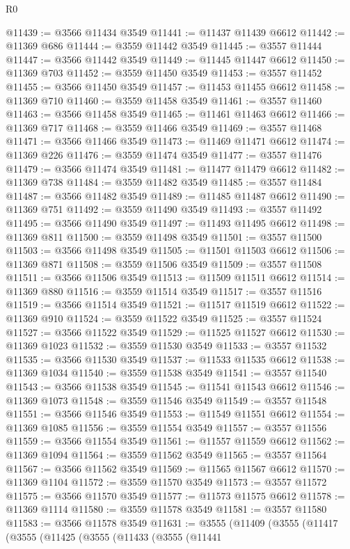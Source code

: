 \begin{lexlean}{R0}
\begin{coremodule}
@11439 := @3566 @11434 @3549
@11441 := @11437 @11439 @6612
@11442 := @11369 @686
@11444 := @3559 @11442 @3549
@11445 := @3557 @11444
@11447 := @3566 @11442 @3549
@11449 := @11445 @11447 @6612
@11450 := @11369 @703
@11452 := @3559 @11450 @3549
@11453 := @3557 @11452
@11455 := @3566 @11450 @3549
@11457 := @11453 @11455 @6612
@11458 := @11369 @710
@11460 := @3559 @11458 @3549
@11461 := @3557 @11460
@11463 := @3566 @11458 @3549
@11465 := @11461 @11463 @6612
@11466 := @11369 @717
@11468 := @3559 @11466 @3549
@11469 := @3557 @11468
@11471 := @3566 @11466 @3549
@11473 := @11469 @11471 @6612
@11474 := @11369 @226
@11476 := @3559 @11474 @3549
@11477 := @3557 @11476
@11479 := @3566 @11474 @3549
@11481 := @11477 @11479 @6612
@11482 := @11369 @738
@11484 := @3559 @11482 @3549
@11485 := @3557 @11484
@11487 := @3566 @11482 @3549
@11489 := @11485 @11487 @6612
@11490 := @11369 @751
@11492 := @3559 @11490 @3549
@11493 := @3557 @11492
@11495 := @3566 @11490 @3549
@11497 := @11493 @11495 @6612
@11498 := @11369 @811
@11500 := @3559 @11498 @3549
@11501 := @3557 @11500
@11503 := @3566 @11498 @3549
@11505 := @11501 @11503 @6612
@11506 := @11369 @871
@11508 := @3559 @11506 @3549
@11509 := @3557 @11508
@11511 := @3566 @11506 @3549
@11513 := @11509 @11511 @6612
@11514 := @11369 @880
@11516 := @3559 @11514 @3549
@11517 := @3557 @11516
@11519 := @3566 @11514 @3549
@11521 := @11517 @11519 @6612
@11522 := @11369 @910
@11524 := @3559 @11522 @3549
@11525 := @3557 @11524
@11527 := @3566 @11522 @3549
@11529 := @11525 @11527 @6612
@11530 := @11369 @1023
@11532 := @3559 @11530 @3549
@11533 := @3557 @11532
@11535 := @3566 @11530 @3549
@11537 := @11533 @11535 @6612
@11538 := @11369 @1034
@11540 := @3559 @11538 @3549
@11541 := @3557 @11540
@11543 := @3566 @11538 @3549
@11545 := @11541 @11543 @6612
@11546 := @11369 @1073
@11548 := @3559 @11546 @3549
@11549 := @3557 @11548
@11551 := @3566 @11546 @3549
@11553 := @11549 @11551 @6612
@11554 := @11369 @1085
@11556 := @3559 @11554 @3549
@11557 := @3557 @11556
@11559 := @3566 @11554 @3549
@11561 := @11557 @11559 @6612
@11562 := @11369 @1094
@11564 := @3559 @11562 @3549
@11565 := @3557 @11564
@11567 := @3566 @11562 @3549
@11569 := @11565 @11567 @6612
@11570 := @11369 @1104
@11572 := @3559 @11570 @3549
@11573 := @3557 @11572
@11575 := @3566 @11570 @3549
@11577 := @11573 @11575 @6612
@11578 := @11369 @1114
@11580 := @3559 @11578 @3549
@11581 := @3557 @11580
@11583 := @3566 @11578 @3549
@11631 := @3555
    (@11409
      (@3555
        (@11417
          (@3555
            (@11425
              (@3555
                (@11433
                  (@3555
                    (@11441

\end{coremodule}
\end{lexlean}
